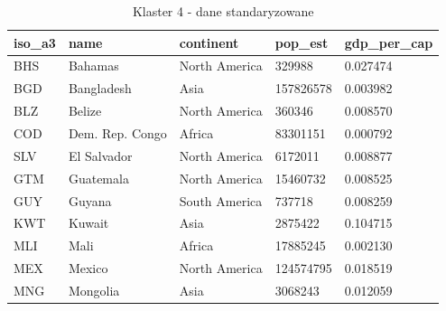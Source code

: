\documentclass[11pt]{report}
\begin{document}
    \begin{table}[h!]
        \caption {Klaster 4 - dane standaryzowane} \label{tab:cl4std}
        \begin{tabular}{lllll}
            \hline
            \multicolumn{1}{|l|}{iso\_a3} & \multicolumn{1}{l|}{name} & \multicolumn{1}{l|}{continent} & \multicolumn{1}{l|}{pop\_est} & \multicolumn{1}{l|}{gdp\_per\_cap} \\ \hline
            BHS                           & Bahamas                   & North America                  & 329988                        & 0.027474                           \\
            BGD                           & Bangladesh                & Asia                           & 157826578                     & 0.003982                           \\
            BLZ                           & Belize                    & North America                  & 360346                        & 0.008570                           \\
            COD                           & Dem. Rep. Congo           & Africa                         & 83301151                      & 0.000792                           \\
            SLV                           & El Salvador               & North America                  & 6172011                       & 0.008877                           \\
            GTM                           & Guatemala                 & North America                  & 15460732                      & 0.008525                           \\
            GUY                           & Guyana                    & South America                  & 737718                        & 0.008259                           \\
            KWT                           & Kuwait                    & Asia                           & 2875422                       & 0.104715                           \\
            MLI                           & Mali                      & Africa                         & 17885245                      & 0.002130                           \\
            MEX                           & Mexico                    & North America                  & 124574795                     & 0.018519                           \\
            MNG                           & Mongolia                  & Asia                           & 3068243                       & 0.012059                           \\

\end{tabular}
\end{table}
\end{document}
